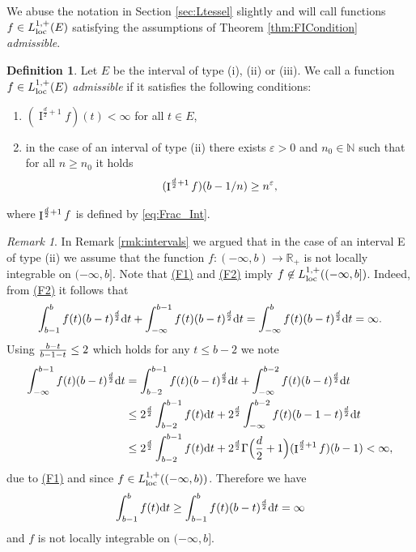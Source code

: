 \documentclass[11pt,a4paper]{article}
\theoremstyle{plain}
\theoremstyle{definition}
\newtheorem{definition}[theorem]{Definition}
\theoremstyle{remark}
\newtheorem{remark}[theorem]{Remark}
\def\NN{\mathbb{N}}
\def\RR{\mathbb{R}}
\newcommand{\frI}{\mathop{\mathrm{I}}\nolimits}
\newcommand{\dint}{\textup{d}}
\begin{document}
We abuse the notation in Section \ref{sec:Ltessel} slightly and will call functions $f\in L_{\rm loc}^{1,+}(E)$ satisfying the assumptions of Theorem \ref{thm:FICondition} \textit{admissible}.
\begin{definition}\label{def:admissible}
    Let $E$ be the interval of type (i), (ii) or (iii). We call a function $f\in L_{\rm loc}^{1,+}(E)$ \textit{admissible} if it satisfies the following conditions:
    \begin{enumerate}
        \item[(F1)] $(\frI^{\frac{d}{2}+1}f)(t) <\infty$ for all $t\in E$, \label{item:F1}
        \item[(F2)] in the case of an interval of type (ii) there exists $\varepsilon > 0$ and $n_0\in \NN$ such that for all $n\ge n_0$ it holds \[(\frI^{{d\over 2}+1}f)(b-1/n) \ge n^\varepsilon,\]\label{item:F2}
    \end{enumerate}
    where $\frI^{{d\over 2}+1}f$ is defined by \eqref{eq:Frac_Int}.    
\end{definition}

\begin{remark}\label{rem:NotLocInt}
    In Remark \ref{rmk:intervals} we argued that in the case of an interval E of type (ii) we assume that the function $f:(-\infty,b)\to \RR_+$ is not locally integrable on $(-\infty,b]$. Note that \hyperref[item:F1]{(F1)} and \hyperref[item:F2]{(F2)} imply $f\not\in L_{\rm loc}^{1,+}((-\infty,b])$. Indeed, from \hyperref[item:F2]{(F2)} it follows that
    \[
        \int_{b-1}^bf(t)(b-t)^{d\over 2}\dint t+\int_{-\infty}^{b-1}f(t)(b-t)^{d\over 2}\dint t=\int_{-\infty}^bf(t)(b-t)^{d\over 2}\dint t=\infty.
    \]
    Using ${b-t\over b-1-t}\leq 2$ which holds for any $t\leq b-2$ we note
    \begin{align*}
        \int_{-\infty}^{b-1}f(t)(b-t)^{d\over 2}\dint t&= \int_{b-2}^{b-1}f(t)(b-t)^{d\over 2}\dint t+\int_{-\infty}^{b-2}f(t)(b-t)^{d\over 2}\dint t\\
        &\leq 2^{d\over 2}\int_{b-2}^{b-1}f(t)\dint t+2^{d\over 2}\int_{-\infty}^{b-2}f(t)(b-1-t)^{d\over 2}\dint t\\
        & \leq 2^{d\over 2}\int_{b-2}^{b-1}f(t)\dint t +2^{d\over 2}\Gamma\Big({d\over 2}+1\Big)(\frI^{{d\over 2}+1}f)(b-1)<\infty,
    \end{align*}
    due to \hyperref[item:F1]{(F1)} and since $f\in L_{\rm loc}^{1,+}((-\infty,b))$. Therefore we have
    \[
        \int_{b-1}^bf(t)\dint t\ge \int_{b-1}^bf(t)(b-t)^{d\over 2}\dint t = \infty
    \]
    and $f$ is not locally integrable on $(-\infty,b]$.
\end{remark}
\end{document}
